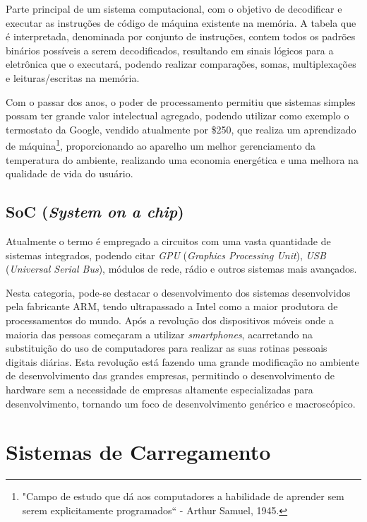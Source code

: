 Parte principal de um sistema computacional, com o objetivo de decodificar e executar as instruções de código de máquina existente na memória\cite{Patterson:2008:COD:1502247}. A tabela que é interpretada, denominada por conjunto de instruções, contem todos os padrões binários possíveis a serem decodificados, resultando em sinais lógicos para a eletrônica que o executará, podendo realizar comparações, somas, multiplexações e leituras/escritas na memória.

Com o passar dos anos, o poder de processamento permitiu que sistemas simples possam ter grande valor intelectual agregado, podendo utilizar como exemplo o termostato da Google, vendido atualmente por \$250, que realiza um aprendizado de máquina\footnote{"Campo de estudo que dá aos computadores a habilidade de aprender sem serem explicitamente programados`` -  Arthur Samuel, 1945.}, proporcionando ao aparelho um melhor gerenciamento da temperatura do ambiente, realizando uma economia energética e uma melhora na qualidade de vida do usuário.

\subsection{SoC (\textit{System on a chip})}

Atualmente o termo é empregado a circuitos com uma vasta quantidade de sistemas integrados, podendo citar  \textit{GPU} (\textit{Graphics Processing Unit}), \textit{USB} (\textit{Universal Serial Bus}), módulos de rede, rádio e outros sistemas mais avançados.


Nesta categoria, pode-se destacar o desenvolvimento dos sistemas desenvolvidos pela fabricante ARM, tendo ultrapassado a Intel como a maior produtora de processamentos do mundo.
Após a revolução dos dispositivos móveis\cite{morearm} onde a maioria das pessoas começaram a utilizar \textit{smartphones}, acarretando na substituição do uso de computadores para realizar as suas rotinas pessoais digitais diárias. Esta revolução está fazendo uma grande modificação no ambiente de desenvolvimento das grandes empresas, permitindo o desenvolvimento de hardware sem a necessidade de empresas altamente especializadas para desenvolvimento, tornando um foco de desenvolvimento genérico e macroscópico.

\section{Sistemas de Carregamento}

